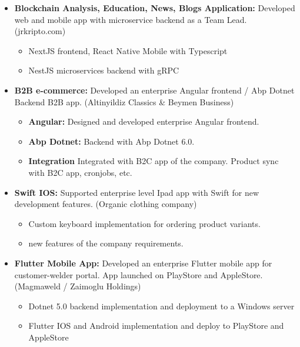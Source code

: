 \documentclass[line,margin]{res}
\begin{document}
\begin{resume}
\begin{itemize}
               \item \textbf{ Blockchain Analysis, Education, News, Blogs Application:  } Developed web and mobile app with microservice backend as a Team Lead. (jrkripto.com)
                \begin{itemize}
                        \item NextJS frontend, React Native Mobile with Typescript
                        \item NestJS microservices backend with gRPC
                \end{itemize}
               \item \textbf{B2B e-commerce: } Developed an enterprise Angular frontend / Abp Dotnet Backend B2B app. (Altinyildiz Classics \& Beymen Business) 
                         \begin{itemize}
                                         \item \textbf{Angular: } Designed and developed enterprise Angular frontend.
                                         \item \textbf{Abp Dotnet: } Backend with Abp Dotnet 6.0.
                                         \item \textbf{Integration} Integrated with B2C app of the company. Product sync with B2C app, cronjobs, etc.
                         \end{itemize}
                 \item \textbf{Swift IOS: } Supported enterprise level Ipad app with Swift for new development features. (Organic clothing company)
                         \begin{itemize}
                                         \item Custom keyboard implementation for ordering product variants.
                                         \item new features of the company requirements.
                         \end{itemize}
                 \item \textbf{Flutter Mobile App: } Developed an enterprise Flutter mobile app for customer-welder portal. App launched on PlayStore and AppleStore.(Magmaweld / Zaimoglu Holdings) 
                         \begin{itemize}
                                         \item Dotnet 5.0 backend implementation and deployment to a Windows server
                                         \item Flutter IOS and Android implementation and deploy to PlayStore and AppleStore

\end{itemize}
\end{itemize}
\end{resume}
\end{document}
